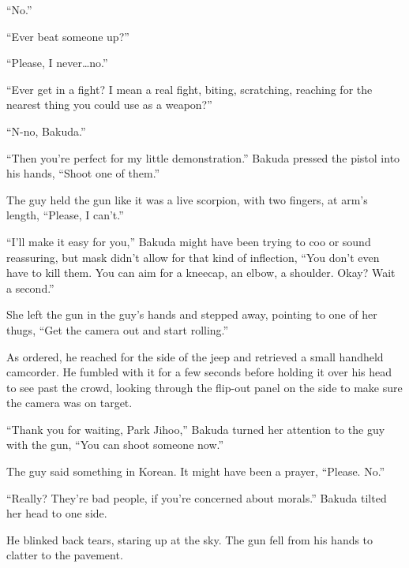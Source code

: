 ``No.''



``Ever beat someone up?''



``Please, I never\ldots no.''



``Ever get in a fight?  I mean a real fight, biting, scratching, reaching for the nearest thing you could use as a weapon?''



``N-no, Bakuda.''



``Then you're perfect for my little demonstration.''  Bakuda pressed the pistol into his hands, ``Shoot one of them.''



The guy held the gun like it was a live scorpion, with two fingers, at arm's length, ``Please, I can't.''



``I'll make it easy for you,'' Bakuda might have been trying to coo or sound reassuring, but mask didn't allow for that kind of inflection, ``You don't even have to kill them.  You can aim for a kneecap, an elbow, a shoulder.  Okay?  Wait a second.''



She left the gun in the guy's hands and stepped away, pointing to one of her thugs, ``Get the camera out and start rolling.''



As ordered, he reached for the side of the jeep and retrieved a small handheld camcorder.  He fumbled with it for a few seconds before holding it over his head to see past the crowd,  looking through the flip-out panel on the side to make sure the camera was on target.



``Thank you for waiting, Park Jihoo,'' Bakuda turned her attention to the guy with the gun, ``You can shoot someone now.''



The guy said something in Korean.  It might have been a prayer, ``Please.  No.''



``Really?  They're bad people, if you're concerned about morals.''  Bakuda tilted her head to one side.



He blinked back tears, staring up at the sky.  The gun fell from his hands to clatter to the pavement.



